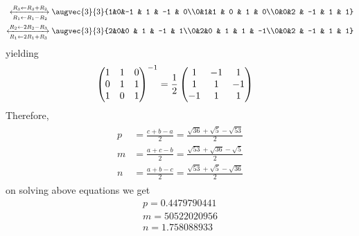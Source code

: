 \documentclass[11pt]{book}
\begin{document}
\begin{enumerate}[label=\thesection.\arabic*.,ref=\thesection.\theenumi]
\begin{align}
			\xleftrightarrow[R_1 \leftarrow R_1 - R_2]{R_3 \leftarrow R_3 + R_2}
			\augvec{3}{3}{1&0&-1 & 1 & -1 & 0\\0&1&1 & 0 & 1 & 0\\0&0&2 & -1 & 1 & 1} \\
			\xleftrightarrow[R_1 \leftarrow 2R_1 + R_3]{R_2 \leftarrow 2R_2 - R_3}
			\augvec{3}{3}{2&0&0 & 1 & -1 & 1\\0&2&0 & 1 & 1 & -1\\0&0&2 & -1 & 1 & 1}
\end{align}
yielding
\begin{align}
			\begin{pmatrix}1&1&0\\0&1&1\\1&0&1\\\end{pmatrix}^{-1} &= 
			\frac{1}{2}\begin{pmatrix}1 & -1 & 1\\ 1 & 1 & -1\\ -1 & 1 & 1\end{pmatrix}
	\end{align}
	Therefore,
\begin{align}
\begin{split}
    p&=\frac{c+b-a}{2}
    =\frac{\sqrt{36}+\sqrt{5}-\sqrt{53}}{2}
    \\
    m&=\frac{a+c-b}{2}
    =\frac{\sqrt{53}+\sqrt{36}-\sqrt{5}}{2}
    \\
    n&=\frac{a+b-c}{2}
    =\frac{\sqrt{53}+\sqrt{5}-\sqrt{36}}{2}
\end{split}
\label{eq:incircle-mnp}
\end{align}
on solving above equations we get
\begin{align}
    p=0.4479790441 \\
    m=50522020956 \\
    n=1.758088933
\end{align}
 

\end{enumerate}
\end{document}
